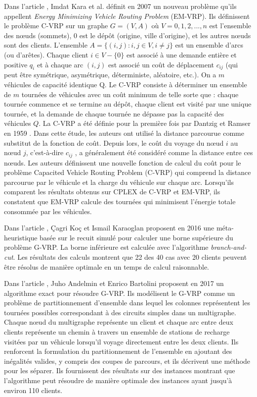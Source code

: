 Dans l'article \cite{article_GVRP10}, Imdat Kara et al. définit en 2007 un nouveau problème qu'ils appellent \textit{Energy Minimizing Vehicle Routing Problem} (EM-VRP). Ils définissent le problème C-VRP sur un graphe $G = (V,A)$ où $V = {0, 1, 2, . . ., n}$ est l'ensemble des nœuds (sommets), $0$ est le dépôt (origine, ville d'origine), et les autres nœuds sont des clients. L'ensemble $A = \{(i, j) : i, j \in V, i \ne j\}$ est un ensemble d'arcs (ou d'arêtes). Chaque client $i \in V-\{0\}$ est associé à une demande entière et positive $q_i$ et à chaque arc $(i, j)$ est associé un coût de déplacement $c_{ij}$ (qui peut être symétrique, asymétrique, déterministe, aléatoire, etc.). On a $m $ véhicules de capacité identique Q. Le C-VRP consiste à déterminer un ensemble de $m$ tournées de véhicules avec un coût minimum de telle sorte que : chaque tournée commence et se termine au dépôt, chaque client est visité par une unique tournée, et la demande de chaque tournée ne dépasse pas la capacité des véhicules $Q$. La C-VRP a été définie pour la première fois par Dantzig et Ramser en 1959 \cite{Dantzig_1959}. Dans cette étude, les auteurs ont utilisé la distance parcourue comme substitut de la fonction de coût. Depuis lors, le coût du voyage du nœud $i$ au nœud $j$, c'est-à-dire $c_{ij}$ , a généralement été considéré comme la distance entre ces nœuds. Les auteurs définissent une nouvelle fonction de calcul du coût pour le problème Capacited Vehicle Routing Problem (C-VRP) qui comprend la distance parcourue par le véhicule et la charge du véhicule sur chaque arc. Lorsqu'ils comparent les résultats obtenus sur CPLEX de C-VRP et EM-VRP, ils constatent que EM-VRP calcule des tournées qui minimisent l'énergie totale consommée par les véhicules.

Dans l'article \cite{article_GVRP11}, Çagri Koç et Ismail Karaoglan proposent en 2016 une méta-heuristique basée sur le recuit simulé pour calculer une borne supérieure du problème G-VRP. La borne inférieure est calculée avec l'algorithme \textit{branch-and-cut}. Les résultats des calculs montrent que 22 des 40 cas avec 20 clients peuvent être résolus de manière optimale en un temps de calcul raisonnable.

Dans l'article \cite{article_GVRP12}, Juho Andelmin et Enrico Bartolini proposent en 2017 un algorithme exact pour résoudre G-VRP. Ils modélisent le G-VRP comme un problème de partitionnement d'ensemble dans lequel les colonnes représentent les tournées possibles correspondant à des circuits simples dans un multigraphe. Chaque nœud du multigraphe représente un client et chaque arc entre deux clients représente un chemin à travers un ensemble de stations de recharge visitées par un véhicule lorsqu'il voyage directement entre les deux clients. Ils renforcent la formulation du partitionnement de l'ensemble en ajoutant des inégalités valides, y compris des coupes de parcours, et ils décrivent une méthode pour les séparer. Ils fournissent des résultats sur des instances montrant que l'algorithme peut résoudre de manière optimale des instances ayant jusqu'à environ 110 clients.


